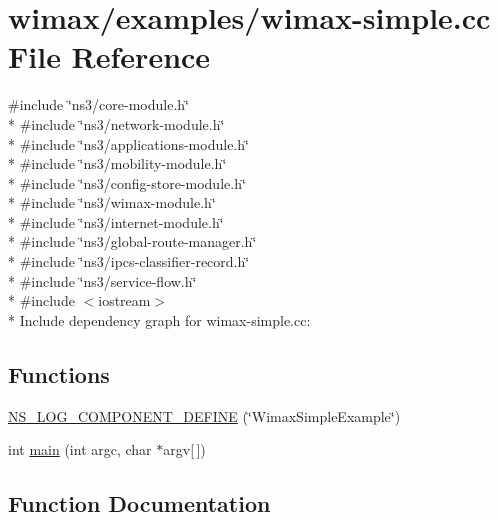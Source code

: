 \hypertarget{wimax-simple_8cc}{}\section{wimax/examples/wimax-\/simple.cc File Reference}
\label{wimax-simple_8cc}
{\ttfamily \#include \char`\"{}ns3/core-\/module.\+h\char`\"{}}\\*
{\ttfamily \#include \char`\"{}ns3/network-\/module.\+h\char`\"{}}\\*
{\ttfamily \#include \char`\"{}ns3/applications-\/module.\+h\char`\"{}}\\*
{\ttfamily \#include \char`\"{}ns3/mobility-\/module.\+h\char`\"{}}\\*
{\ttfamily \#include \char`\"{}ns3/config-\/store-\/module.\+h\char`\"{}}\\*
{\ttfamily \#include \char`\"{}ns3/wimax-\/module.\+h\char`\"{}}\\*
{\ttfamily \#include \char`\"{}ns3/internet-\/module.\+h\char`\"{}}\\*
{\ttfamily \#include \char`\"{}ns3/global-\/route-\/manager.\+h\char`\"{}}\\*
{\ttfamily \#include \char`\"{}ns3/ipcs-\/classifier-\/record.\+h\char`\"{}}\\*
{\ttfamily \#include \char`\"{}ns3/service-\/flow.\+h\char`\"{}}\\*
{\ttfamily \#include $<$iostream$>$}\\*
Include dependency graph for wimax-\/simple.cc\+:
\subsection*{Functions}
\begin{DoxyCompactItemize}
\item 
\hyperlink{wimax-simple_8cc_a4d936e15daac1dfcb5a2d68c4b8b3da2}{N\+S\+\_\+\+L\+O\+G\+\_\+\+C\+O\+M\+P\+O\+N\+E\+N\+T\+\_\+\+D\+E\+F\+I\+NE} (\char`\"{}Wimax\+Simple\+Example\char`\"{})
\item 
int \hyperlink{wimax-simple_8cc_a0ddf1224851353fc92bfbff6f499fa97}{main} (int argc, char $\ast$argv\mbox{[}$\,$\mbox{]})
\end{DoxyCompactItemize}


\subsection{Function Documentation}
